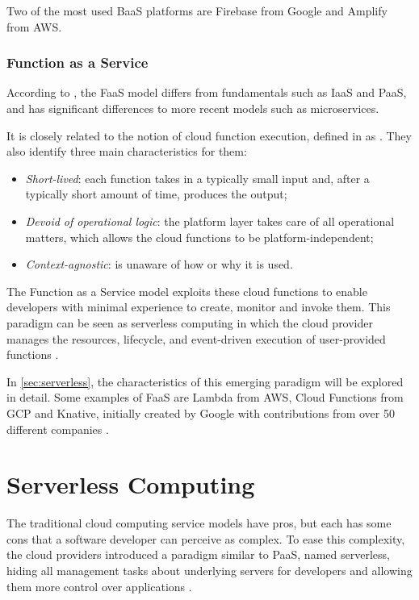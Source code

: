 \documentclass[../thesis.tex]{subfiles}
\begin{document}
Two of the most used BaaS platforms are Firebase from Google and Amplify from \acrshort{AWS}.

\subsubsection{Function as a Service}
According to \cite{inproceedings:faas_implications_2019}, the FaaS model differs from fundamentals such as IaaS and PaaS, and has significant differences to more recent models such as microservices.

It is closely related to the notion of cloud function execution, defined in \cite{article:faas_serverless_2017} as . They also identify three main characteristics for them:
\begin{itemize}
    \item \textit{Short-lived}: each function takes in a typically small input and, after a typically short amount of time, produces the output;
    \item \textit{Devoid of operational logic}: the platform layer takes care of all operational matters, which allows the cloud functions to be platform-independent;
    \item \textit{Context-agnostic}: is unaware of how or why it is used.
\end{itemize}
The Function as a Service model exploits these cloud functions to enable developers with minimal experience to create, monitor and invoke them. This paradigm can be seen as serverless computing in which the cloud provider manages the resources, lifecycle, and event-driven execution of user-provided functions \cite{article:serverless_is_more_2018}.

In \autoref{sec:serverless}, the characteristics of this emerging paradigm will be explored in detail. Some examples of FaaS are Lambda from \acrshort{AWS}, Cloud Functions from \acrshort{GCP} and Knative, initially created by Google with contributions from over 50 different companies \cite{site:creator_knative}.

\section{Serverless Computing}\label{sec:serverless}
The traditional cloud computing service models have pros, but each has some cons that a software developer can perceive as complex. To ease this complexity, the cloud providers introduced a paradigm similar to PaaS, named serverless, hiding all management tasks about underlying servers for developers and allowing them more control over applications \cite{article:review_serverless_2023}.
\end{document}
